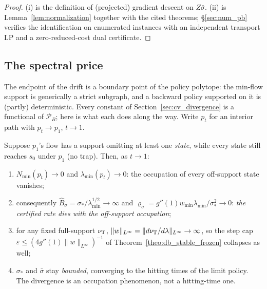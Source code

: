 \begin{proof}
(i) is the definition of (projected) gradient descent on $Z\bar\sigma$. (ii) is
Lemma~\ref{lem:normalization} together with the cited theorems; \S\ref{sec:num_pb}
verifies the identification on enumerated instances with an independent transport LP and
a zero-reduced-cost dual certificate.
\end{proof}

\subsection{The spectral price}\label{sec:price}

The endpoint of the drift is a boundary point of the policy polytope: the min-flow
support is generically a strict subgraph, and a backward policy supported on it is
(partly) deterministic. Every constant of Section~\ref{sec:cv_divergence} is a functional
of $\mathcal P_B$; here is what each does along the way. Write $p_t$ for an interior path
with $p_t\to p_1$, $t\to1$.

\begin{proposition}\label{prop:constants_path}
Suppose $p_1$'s flow has a support omitting at least one \emph{state}, while every state
still reaches $s_0$ under $p_1$ (no trap). Then, as $t\to1$:
\begin{enumerate}
    \item $N_{\min}(p_t)\to0$ and $\lambda_{\min}(p_t)\to0$: the occupation of every
    off-support state vanishes;
    \item consequently $\widehat B_\sigma = \sigma_*/\lambda_{\min}^{1/2}\to\infty$ and
    $\varrho_\sigma = g''(1)w_{\min}\lambda_{\min}/\sigma_*^2\to0$: \emph{the certified
    rate dies with the off-support occupation};
    \item for any fixed full-support $\nu_{\mathrm{T}}$, $\|w\|_{L^\infty} =
    \|d\nu_{\mathrm{T}}/d\lambda\|_{L^\infty}\to\infty$, so the step cap
    $\varepsilon\leq(4g''(1)\|w\|_{L^\infty})^{-1}$ of
    Theorem~\ref{theo:db_stable_frozen} collapses as well;
    \item $\sigma_*$ and $\bar\sigma$ stay \emph{bounded}, converging to the hitting
    times of the limit policy. The divergence is an occupation phenomenon, not a
    hitting-time one.
\end{enumerate}
\end{proposition}

